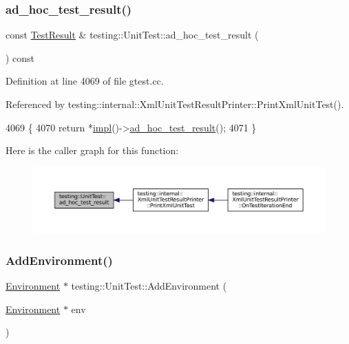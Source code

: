 \subsubsection{\texorpdfstring{ad\+\_\+hoc\+\_\+test\+\_\+result()}{ad\_hoc\_test\_result()}}
{\footnotesize\ttfamily const \hyperlink{classtesting_1_1TestResult}{Test\+Result} \& testing\+::\+Unit\+Test\+::ad\+\_\+hoc\+\_\+test\+\_\+result (\begin{DoxyParamCaption}{ }\end{DoxyParamCaption}) const}



Definition at line 4069 of file gtest.\+cc.



Referenced by testing\+::internal\+::\+Xml\+Unit\+Test\+Result\+Printer\+::\+Print\+Xml\+Unit\+Test().


\begin{DoxyCode}
4069                                                      \{
4070   \textcolor{keywordflow}{return} *\hyperlink{classtesting_1_1UnitTest_a4df5d11a58affb337d7fa62eaa07690e}{impl}()->\hyperlink{classtesting_1_1internal_1_1UnitTestImpl_a8be26dc90e0fac8f8be3552ffd98c69c}{ad\_hoc\_test\_result}();
4071 \}
\end{DoxyCode}
Here is the caller graph for this function\+:
\nopagebreak
\begin{figure}[H]
\begin{center}
\leavevmode
\includegraphics[width=350pt]{classtesting_1_1UnitTest_aa59dde4c3dc43a920ed142a27670686c_icgraph}
\end{center}
\end{figure}
\mbox{\label{classtesting_1_1UnitTest_a1eb8e999b8696889bf1c64b4f0161203}} 
\subsubsection{\texorpdfstring{Add\+Environment()}{AddEnvironment()}}
{\footnotesize\ttfamily \hyperlink{classtesting_1_1Environment}{Environment} $\ast$ testing\+::\+Unit\+Test\+::\+Add\+Environment (\begin{DoxyParamCaption}\item[{\hyperlink{classtesting_1_1Environment}{Environment} $\ast$}]{env }\end{DoxyParamCaption})\hspace{0.3cm}{\ttfamily [private]}}



